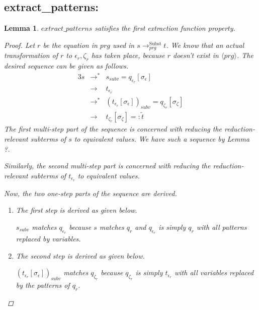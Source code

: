 \documentclass[11pt]{article} %
\newtheorem*{lemma*}{Lemma}
\begin{document}
\begin{framed}
\subsection*{extract\_patterns:}

\begin{lemma*}

$extract\_patterns$ satisfies the first extraction function property.

\begin{proof}

Let $r$ be the equation in $prg$ used in $s \longrightarrow^{\textrm{Subst}}_{prg} t$. We know that an actual transformation of $r$ to $\epsilon_r, \zeta_r$ has taken place, because $r$ doesn't exist in $\langle prg \rangle$. The desired sequence can be given as follows.
\begin{alignat*}{3}
s &\longrightarrow^* &s_{subv} = q_{\epsilon_r}[\sigma_\epsilon]\\
&\longrightarrow &t_{\epsilon_r}\\
&\longrightarrow^*  &(t_{\epsilon_r}[\sigma_\epsilon])_{subv} = q_{\zeta_r}[\sigma_\zeta]\\
&\longrightarrow &t_{\zeta_r}[\sigma_\zeta] =: \widetilde{t}
\end{alignat*}
The first multi-step part of the sequence is concerned with reducing the reduction-relevant subterms of $s$ to equivalent values. We have such a sequence by Lemma ?.

Similarly, the second multi-step part is concerned with reducing the reduction-relevant subterms of $t_{\epsilon_r}$ to equivalent values.

Now, the two one-step parts of the sequence are derived.

\begin{enumerate}
\item The first step is derived as given below.
\begin{prooftree}
\end{prooftree}
$s_{subv}$ matches $q_{\epsilon_r}$ because $s$ matches $q_r$ and $q_{\epsilon_r}$ is simply $q_r$ with all patterns replaced by variables.

\item The second step is derived as given below.
\begin{prooftree}
\end{prooftree}
$(t_{\epsilon_r}[\sigma_\epsilon])_{subv}$ matches $q_{\zeta_r}$ because $q_{\zeta_r}$ is simply $t_{\epsilon_r}$ with all variables replaced by the patterns of $q_r$.


\end{enumerate}
\end{proof}
\end{lemma*}
\end{framed}
\end{document}
